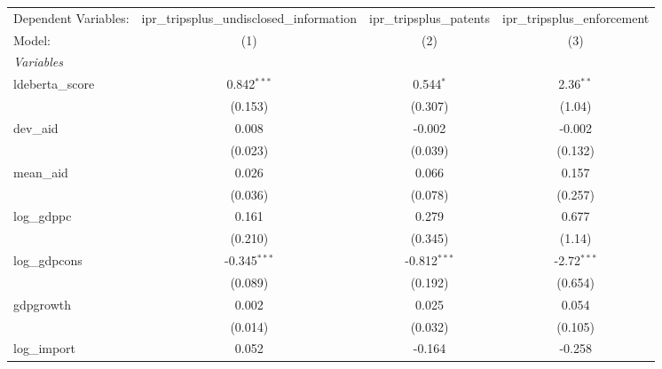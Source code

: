 
\begingroup
\centering
\begin{tabular}{lccc}
   \tabularnewline \midrule \midrule
   Dependent Variables:                  & ipr\_tripsplus\_undisclosed\_information    & ipr\_tripsplus\_patents   & ipr\_tripsplus\_enforcement\\    
   Model:                                & (1)                                         & (2)                       & (3)\\  
   \midrule
   \emph{Variables}\\
   ldeberta\_score                       & 0.842$^{***}$                               & 0.544$^{*}$               & 2.36$^{**}$\\   
                                         & (0.153)                                     & (0.307)                   & (1.04)\\   
   dev\_aid                              & 0.008                                       & -0.002                    & -0.002\\   
                                         & (0.023)                                     & (0.039)                   & (0.132)\\   
   mean\_aid                             & 0.026                                       & 0.066                     & 0.157\\   
                                         & (0.036)                                     & (0.078)                   & (0.257)\\   
   log\_gdppc                            & 0.161                                       & 0.279                     & 0.677\\   
                                         & (0.210)                                     & (0.345)                   & (1.14)\\   
   log\_gdpcons                          & -0.345$^{***}$                              & -0.812$^{***}$            & -2.72$^{***}$\\   
                                         & (0.089)                                     & (0.192)                   & (0.654)\\   
   gdpgrowth                             & 0.002                                       & 0.025                     & 0.054\\   
                                         & (0.014)                                     & (0.032)                   & (0.105)\\   
   log\_import                           & 0.052                                       & -0.164                    & -0.258\\   

\end{tabular}
